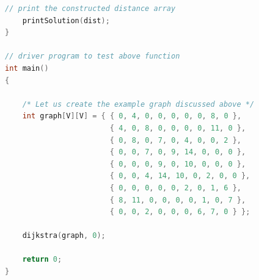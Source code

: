 \documentclass[11pt]{scrartcl}
\begin{document}
\begin{lstlisting}[language = c++]
    // print the constructed distance array
    printSolution(dist);
}
 
// driver program to test above function
int main()
{
   
    /* Let us create the example graph discussed above */
    int graph[V][V] = { { 0, 4, 0, 0, 0, 0, 0, 8, 0 },
                        { 4, 0, 8, 0, 0, 0, 0, 11, 0 },
                        { 0, 8, 0, 7, 0, 4, 0, 0, 2 },
                        { 0, 0, 7, 0, 9, 14, 0, 0, 0 },
                        { 0, 0, 0, 9, 0, 10, 0, 0, 0 },
                        { 0, 0, 4, 14, 10, 0, 2, 0, 0 },
                        { 0, 0, 0, 0, 0, 2, 0, 1, 6 },
                        { 8, 11, 0, 0, 0, 0, 1, 0, 7 },
                        { 0, 0, 2, 0, 0, 0, 6, 7, 0 } };
 
    dijkstra(graph, 0);
 
    return 0;
}

\end{lstlisting}
\end{document}
